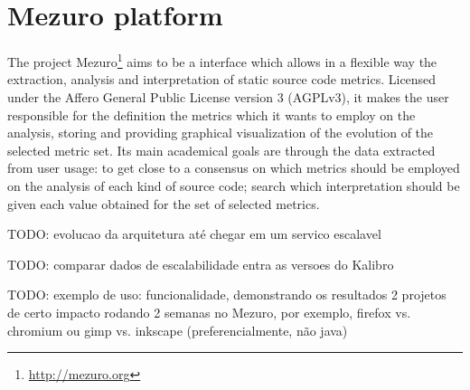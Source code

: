 \newpage
\section{Mezuro platform}
\label{sec:mezuro}

The project Mezuro\footnote{\url{http://mezuro.org}} aims to be a interface which allows in a flexible way the extraction, analysis and interpretation of static source code metrics. Licensed under the Affero General Public License version 3 (AGPLv3), it makes the user responsible for the definition the metrics which it wants to employ on the analysis, storing and providing graphical visualization of the evolution of the selected metric set. Its main academical goals are through the data extracted from user usage: to get close to a consensus on which metrics should be employed on the analysis of each kind of source code; search which interpretation should be given each value obtained for the set of selected metrics.

TODO: evolucao da arquitetura até chegar em um servico escalavel

TODO: comparar dados de escalabilidade entra as versoes do Kalibro

TODO: exemplo de uso: funcionalidade, demonstrando os resultados 2 projetos de
certo impacto rodando 2 semanas no Mezuro, por exemplo, firefox vs.  chromium
ou gimp vs. inkscape (preferencialmente, não java)





